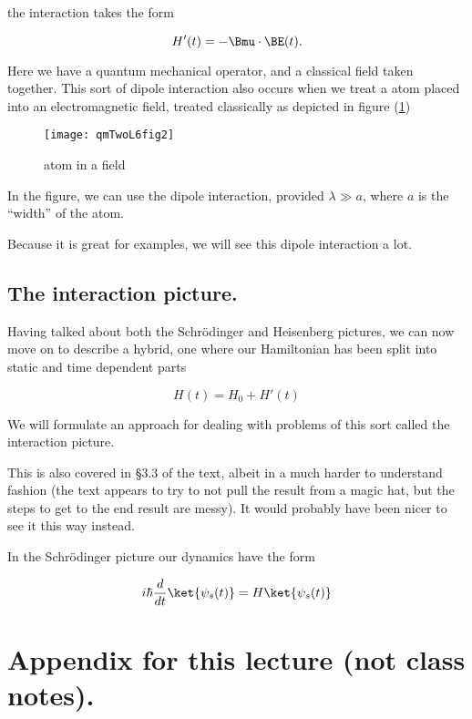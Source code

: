 the interaction takes the form

\begin{equation}\label{eqn:qmTwoL6:90}
H'(t) = -\Bmu \cdot \BE(t).
\end{equation}

Here we have a quantum mechanical operator, and a classical field taken together.  This sort of dipole interaction also occurs when we treat a atom placed into an electromagnetic field, treated classically as depicted in figure (\ref{fig:qmTwoL6fig2})

\begin{figure}[htp]
\centering
\texttt{[image: qmTwoL6fig2]}
\caption{atom in a field}\label{fig:qmTwoL6fig2}
\end{figure}

In the figure, we can use the dipole interaction, provided $\lambda \gg a$, where $a$ is the ``width'' of the atom.

Because it is great for examples, we will see this dipole interaction a lot.

\subsection{The interaction picture.}

Having talked about both the Schr\"{o}dinger and Heisenberg pictures, we can now move on to describe a hybrid, one where our Hamiltonian has been split into static and time dependent parts

\begin{equation}\label{eqn:qmTwoL6:110}
H(t) = H_0 + H'(t)
\end{equation}

We will formulate an approach for dealing with problems of this sort called the interaction picture.

This is also covered in \S 3.3 of the text, albeit in a much harder to understand fashion (the text appears to try to not pull the result from a magic hat, but the steps to get to the end result are messy).  It would probably have been nicer to see it this way instead.

In the Schr\"{o}dinger picture our dynamics have the form

\begin{equation}\label{eqn:qmTwoL6:130}
i \hbar \frac{d}{dt} \ket{\psi_s(t)} = H \ket{\psi_s(t)}
\end{equation}

\section{Appendix for this lecture (not class notes).}

